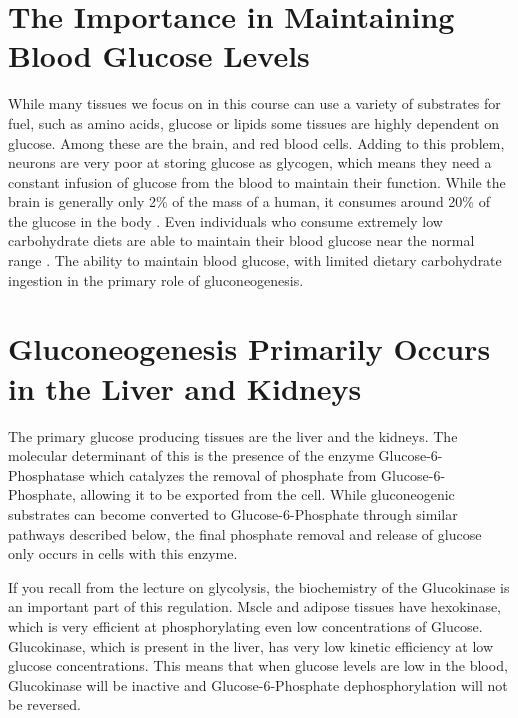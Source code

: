 \documentclass{tufte-handout}
\begin{document}
\section{The Importance in Maintaining Blood Glucose Levels}

While many tissues we focus on in this course can use a variety of substrates for fuel, such as amino acids, glucose or lipids some tissues are highly dependent on glucose.  Among these are the brain, and red blood cells.  Adding to this problem, neurons are very poor at storing glucose as glycogen, which means they need a constant infusion of glucose from the blood to maintain their function.  While the brain is generally only 2\% of the mass of a human, it consumes around 20\% of the glucose in the body \citep{Erbsloh1958}.  Even individuals who consume extremely low carbohydrate diets are able to maintain their blood glucose near the normal range \citep{Bueno2013}.  The ability to maintain blood glucose, with limited dietary carbohydrate ingestion in the primary role of gluconeogenesis.

\section{Gluconeogenesis Primarily Occurs in the Liver and Kidneys}

The primary glucose producing tissues are the liver and the kidneys.  The molecular determinant of this is the presence of the enzyme Glucose-6-Phosphatase which catalyzes the removal of phosphate from Glucose-6-Phosphate, allowing it to be exported from the cell.  While gluconeogenic substrates can become converted to Glucose-6-Phosphate through similar pathways described below, the final phosphate removal and release of glucose only occurs in cells with this enzyme.

  If you recall from the lecture on glycolysis, the biochemistry of the Glucokinase is an important part of this regulation.  Mscle and adipose tissues have hexokinase, which is very efficient at phosphorylating even low concentrations of Glucose. Glucokinase, which is present in the liver, has very low kinetic efficiency at low glucose concentrations.  This means that when glucose levels are low in the blood, Glucokinase will be inactive and Glucose-6-Phosphate dephosphorylation will not be reversed.
\end{document}
